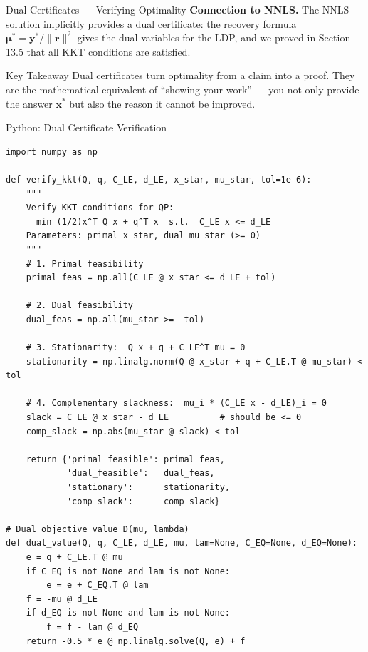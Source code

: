 \documentclass[aspectratio=169,10pt]{beamer}
\newcommand{\bx}{\mathbf{x}}
\newcommand{\bmu}{\boldsymbol{\mu}}
\begin{document}
\begin{frame}[allowframebreaks]{Dual Certificates --- Verifying Optimality}
  \textbf{Connection to NNLS.}  The NNLS solution implicitly provides a dual
  certificate: the recovery formula $\bmu^* = \mathbf{y}^*/\|\mathbf{r}\|^2$
  gives the dual variables for the LDP, and we proved in Section 13.5 that
  all KKT conditions are satisfied.

  \begin{alertblock}{Key Takeaway}
    Dual certificates turn optimality from a claim into a proof.  They are the
    mathematical equivalent of ``showing your work'' --- you not only provide the
    answer $\bx^*$ but also the reason it cannot be improved.
  \end{alertblock}

\end{frame}

\begin{frame}[fragile]{Python: Dual Certificate Verification}
\begin{lstlisting}[caption={Check KKT conditions for a QP solution using NumPy}]
import numpy as np

def verify_kkt(Q, q, C_LE, d_LE, x_star, mu_star, tol=1e-6):
    """
    Verify KKT conditions for QP:
      min (1/2)x^T Q x + q^T x  s.t.  C_LE x <= d_LE
    Parameters: primal x_star, dual mu_star (>= 0)
    """
    # 1. Primal feasibility
    primal_feas = np.all(C_LE @ x_star <= d_LE + tol)

    # 2. Dual feasibility
    dual_feas = np.all(mu_star >= -tol)

    # 3. Stationarity:  Q x + q + C_LE^T mu = 0
    stationarity = np.linalg.norm(Q @ x_star + q + C_LE.T @ mu_star) < tol

    # 4. Complementary slackness:  mu_i * (C_LE x - d_LE)_i = 0
    slack = C_LE @ x_star - d_LE          # should be <= 0
    comp_slack = np.abs(mu_star @ slack) < tol

    return {'primal_feasible': primal_feas,
            'dual_feasible':   dual_feas,
            'stationary':      stationarity,
            'comp_slack':      comp_slack}

# Dual objective value D(mu, lambda)
def dual_value(Q, q, C_LE, d_LE, mu, lam=None, C_EQ=None, d_EQ=None):
    e = q + C_LE.T @ mu
    if C_EQ is not None and lam is not None:
        e = e + C_EQ.T @ lam
    f = -mu @ d_LE
    if d_EQ is not None and lam is not None:
        f = f - lam @ d_EQ
    return -0.5 * e @ np.linalg.solve(Q, e) + f
\end{lstlisting}
\end{frame}
\end{document}
